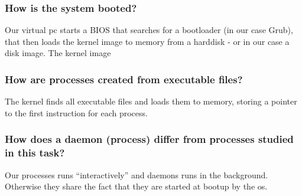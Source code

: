 \subsubsection*{How is the system booted?}
Our virtual pc starts a BIOS that searches for a bootloader (in our case Grub), that then loads the kernel image to memory from a harddisk - or in our case a disk image. The kernel image 
\subsubsection*{How are processes created from executable files?}
The kernel finds all executable files and loads them to memory, storing a pointer to the first instruction for each process.

\subsubsection*{How does a daemon (process) differ from processes studied in this task?}
Our processes runs ``interactively'' and daemons runs in the background. Otherwise they share the fact that they are started at bootup by the os.
